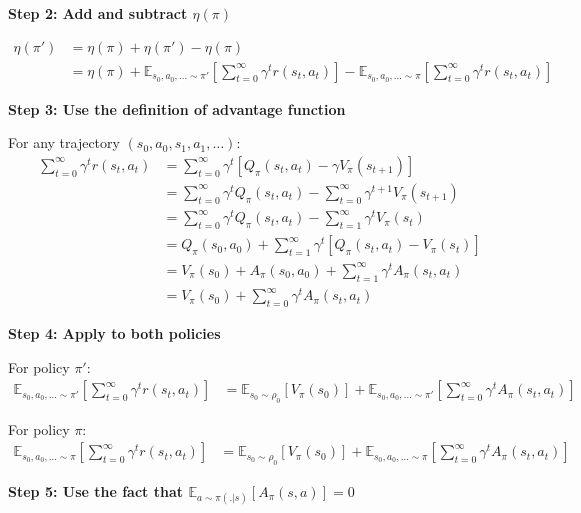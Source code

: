 \textbf{Step 2: Add and subtract $\eta(\pi)$}

\begin{align}
\eta(\pi') &= \eta(\pi) + \eta(\pi') - \eta(\pi) \\
&= \eta(\pi) + \mathbb{E}_{s_0, a_0, \ldots \sim \pi'} \left[ \sum_{t = 0}^{\infty} \gamma^t r(s_t, a_t) \right] - \mathbb{E}_{s_0, a_0, \ldots \sim \pi} \left[ \sum_{t = 0}^{\infty} \gamma^t r(s_t, a_t) \right]
\end{align}

\textbf{Step 3: Use the definition of advantage function}

For any trajectory $(s_0, a_0, s_1, a_1, \ldots)$:
\begin{align}
\sum_{t = 0}^{\infty} \gamma^t r(s_t, a_t) &= \sum_{t = 0}^{\infty} \gamma^t [Q_\pi(s_t, a_t) - \gamma V_\pi(s_{t+1})] \\
&= \sum_{t = 0}^{\infty} \gamma^t Q_\pi(s_t, a_t) - \sum_{t = 0}^{\infty} \gamma^{t+1} V_\pi(s_{t+1}) \\
&= \sum_{t = 0}^{\infty} \gamma^t Q_\pi(s_t, a_t) - \sum_{t = 1}^{\infty} \gamma^t V_\pi(s_t) \\
&= Q_\pi(s_0, a_0) + \sum_{t = 1}^{\infty} \gamma^t [Q_\pi(s_t, a_t) - V_\pi(s_t)] \\
&= V_\pi(s_0) + A_\pi(s_0, a_0) + \sum_{t = 1}^{\infty} \gamma^t A_\pi(s_t, a_t) \\
&= V_\pi(s_0) + \sum_{t = 0}^{\infty} \gamma^t A_\pi(s_t, a_t)
\end{align}

\textbf{Step 4: Apply to both policies}

For policy $\pi'$:
\begin{align}
\mathbb{E}_{s_0, a_0, \ldots \sim \pi'} \left[ \sum_{t = 0}^{\infty} \gamma^t r(s_t, a_t) \right] &= \mathbb{E}_{s_0 \sim \rho_0} [V_\pi(s_0)] + \mathbb{E}_{s_0, a_0, \ldots \sim \pi'} \left[ \sum_{t = 0}^{\infty} \gamma^t A_\pi(s_t, a_t) \right]
\end{align}

For policy $\pi$:
\begin{align}
\mathbb{E}_{s_0, a_0, \ldots \sim \pi} \left[ \sum_{t = 0}^{\infty} \gamma^t r(s_t, a_t) \right] &= \mathbb{E}_{s_0 \sim \rho_0} [V_\pi(s_0)] + \mathbb{E}_{s_0, a_0, \ldots \sim \pi} \left[ \sum_{t = 0}^{\infty} \gamma^t A_\pi(s_t, a_t) \right]
\end{align}

\textbf{Step 5: Use the fact that $\mathbb{E}_{a \sim \pi(.|s)}[A_\pi(s,a)] = 0$}

